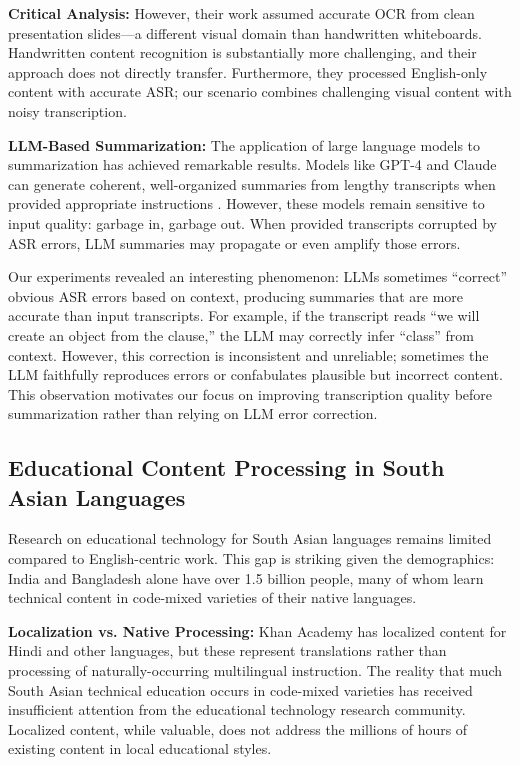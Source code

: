 \textbf{Critical Analysis:} However, their work assumed accurate OCR from clean presentation slides---a different visual domain than handwritten whiteboards. Handwritten content recognition is substantially more challenging, and their approach does not directly transfer. Furthermore, they processed English-only content with accurate ASR; our scenario combines challenging visual content with noisy transcription.

\textbf{LLM-Based Summarization:} The application of large language models to summarization has achieved remarkable results. Models like GPT-4 and Claude can generate coherent, well-organized summaries from lengthy transcripts when provided appropriate instructions \cite{Goyal2023}. However, these models remain sensitive to input quality: garbage in, garbage out. When provided transcripts corrupted by ASR errors, LLM summaries may propagate or even amplify those errors.

Our experiments revealed an interesting phenomenon: LLMs sometimes ``correct'' obvious ASR errors based on context, producing summaries that are more accurate than input transcripts. For example, if the transcript reads ``we will create an object from the clause,'' the LLM may correctly infer ``class'' from context. However, this correction is inconsistent and unreliable; sometimes the LLM faithfully reproduces errors or confabulates plausible but incorrect content. This observation motivates our focus on improving transcription quality before summarization rather than relying on LLM error correction.

\subsection{Educational Content Processing in South Asian Languages}

Research on educational technology for South Asian languages remains limited compared to English-centric work. This gap is striking given the demographics: India and Bangladesh alone have over 1.5 billion people, many of whom learn technical content in code-mixed varieties of their native languages.

\textbf{Localization vs. Native Processing:} Khan Academy has localized content for Hindi and other languages, but these represent translations rather than processing of naturally-occurring multilingual instruction. The reality that much South Asian technical education occurs in code-mixed varieties has received insufficient attention from the educational technology research community. Localized content, while valuable, does not address the millions of hours of existing content in local educational styles.

